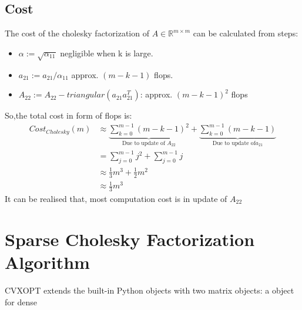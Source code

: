 \subsection*{Cost}
The cost of the cholesky factorization of $A\in \mathbb{R}^{m\times m}$ can be calculated from steps:
\begin{itemize}
	\item $\alpha := \sqrt{\alpha_{11}}$ negligible when k is large.
	\item $a_21 := a_{21}/\alpha_{11}$ approx. $(m-k-1)$ flops.
	\item $A_{22}:=A_{22}-triangular(a_{21}a_{21}^T)$: approx. $(m-k-1)^2$ flops
\end{itemize}
So,the total cost in form of flops is:
\begin{equation*}
	\begin{aligned}
		Cost_{Cholesky}(m) &\approx \underbrace{\sum_{k=0}^{m-1}{(m-k-1)^2} }_\textrm{Due to update of $A_{22}$} + \underbrace{\sum_{k=0}^{m-1}{(m-k-1)}}_\textrm{Due to update of$a_{21}$}\\
		&=\sum_{j=0}^{m-1}{j^2}+\sum_{j=0}^{m-1}{j}\\
		&\approx \frac{1}{3}m^3+\frac{1}{2}m^2\\
		&\approx \frac{1}{3}m^3
	\end{aligned}
\end{equation*}
It can be realised that, most computation cost is in update of $A_{22}$


\section{Sparse Cholesky Factorization Algorithm}

CVXOPT extends the built-in Python objects with two matrix objects: a  object for dense 
















































